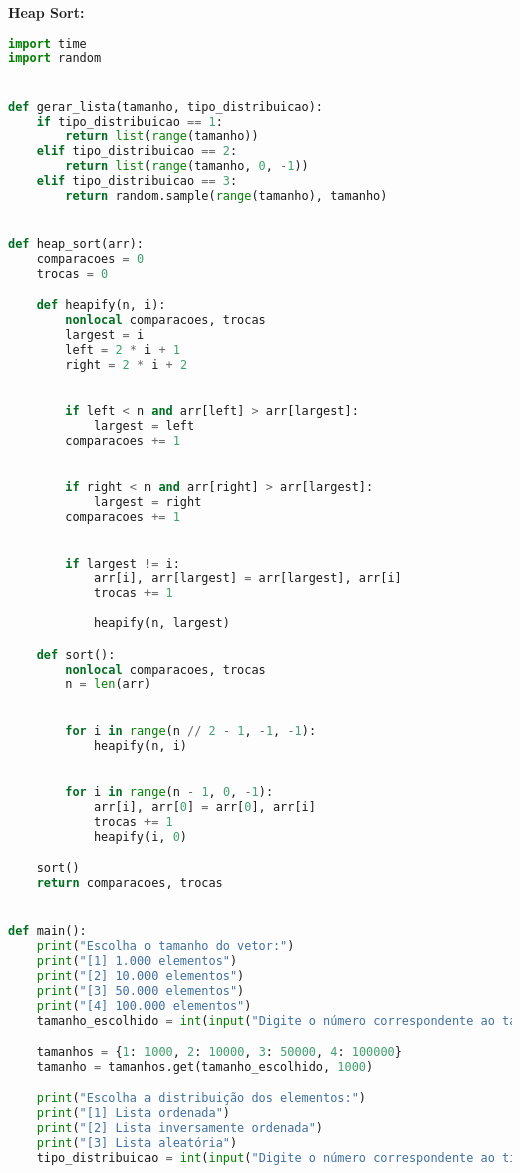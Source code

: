 \documentclass[a4paper,12pt]{article}
\begin{document}
\textbf{Heap Sort: } \\
\begin{lstlisting}[language=Python]
import time
import random


def gerar_lista(tamanho, tipo_distribuicao):
    if tipo_distribuicao == 1:
        return list(range(tamanho))
    elif tipo_distribuicao == 2:
        return list(range(tamanho, 0, -1))
    elif tipo_distribuicao == 3:
        return random.sample(range(tamanho), tamanho)


def heap_sort(arr):
    comparacoes = 0
    trocas = 0

    def heapify(n, i):
        nonlocal comparacoes, trocas
        largest = i 
        left = 2 * i + 1  
        right = 2 * i + 2  

        
        if left < n and arr[left] > arr[largest]:
            largest = left
        comparacoes += 1

        
        if right < n and arr[right] > arr[largest]:
            largest = right
        comparacoes += 1

       
        if largest != i:
            arr[i], arr[largest] = arr[largest], arr[i]  
            trocas += 1
            
            heapify(n, largest)

    def sort():
        nonlocal comparacoes, trocas
        n = len(arr)

        
        for i in range(n // 2 - 1, -1, -1):
            heapify(n, i)

        
        for i in range(n - 1, 0, -1):
            arr[i], arr[0] = arr[0], arr[i]  
            trocas += 1
            heapify(i, 0)

    sort()
    return comparacoes, trocas


def main():
    print("Escolha o tamanho do vetor:")
    print("[1] 1.000 elementos")
    print("[2] 10.000 elementos")
    print("[3] 50.000 elementos")
    print("[4] 100.000 elementos")
    tamanho_escolhido = int(input("Digite o número correspondente ao tamanho do vetor: "))

    tamanhos = {1: 1000, 2: 10000, 3: 50000, 4: 100000}
    tamanho = tamanhos.get(tamanho_escolhido, 1000)

    print("Escolha a distribuição dos elementos:")
    print("[1] Lista ordenada")
    print("[2] Lista inversamente ordenada")
    print("[3] Lista aleatória")
    tipo_distribuicao = int(input("Digite o número correspondente ao tipo de distribuição: "))


\end{lstlisting}
\end{document}
